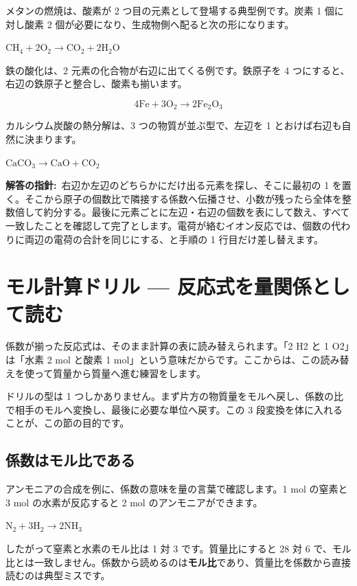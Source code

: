 \documentclass{article}
\begin{document}
メタンの燃焼は、酸素が 2 つ目の元素として登場する典型例です。炭素 1 個に対し酸素 2 個が必要になり、生成物側へ配ると次の形になります。

\( \mathrm{CH}_{4} + 2\mathrm{O}_{2} \rightarrow \mathrm{CO}_{2} + 2\mathrm{H}_{2}\mathrm{O} \)

鉄の酸化は、2 元素の化合物が右辺に出てくる例です。鉄原子を 4 つにすると、右辺の鉄原子と整合し、酸素も揃います。

\[ 4\mathrm{Fe} + 3\mathrm{O}_{2} \rightarrow 2\mathrm{Fe}_{2}\mathrm{O}_{3} \]

カルシウム炭酸の熱分解は、3 つの物質が並ぶ型で、左辺を 1 とおけば右辺も自然に決まります。

\( \mathrm{CaCO}_{3} \rightarrow \mathrm{CaO} + \mathrm{CO}_{2} \)

\textbf{解答の指針:}\ 右辺か左辺のどちらかにだけ出る元素を探し、そこに最初の 1 を置く。そこから原子の個数比で隣接する係数へ伝播させ、小数が残ったら全体を整数倍して約分する。最後に元素ごとに左辺・右辺の個数を表にして数え、すべて一致したことを確認して完了とします。電荷が絡むイオン反応では、個数の代わりに両辺の電荷の合計を同じにする、と手順の 1 行目だけ差し替えます。

\section{モル計算ドリル — 反応式を量関係として読む}

係数が揃った反応式は、そのまま計算の表に読み替えられます。「2 H2 と 1 O2」は「水素 2 mol と酸素 1 mol」という意味だからです。ここからは、この読み替えを使って質量から質量へ進む練習をします。

ドリルの型は 1 つしかありません。まず片方の物質量をモルへ戻し、係数の比で相手のモルへ変換し、最後に必要な単位へ戻す。この 3 段変換を体に入れることが、この節の目的です。

\subsection{係数はモル比である}

アンモニアの合成を例に、係数の意味を量の言葉で確認します。1 mol の窒素と 3 mol の水素が反応すると 2 mol のアンモニアができます。

\( \mathrm{N}_{2} + 3\mathrm{H}_{2} \rightarrow 2\mathrm{NH}_{3} \)

したがって窒素と水素のモル比は 1 対 3 です。質量比にすると 28 対 6 で、モル比とは一致しません。係数から読めるのは\textbf{モル比}であり、質量比を係数から直接読むのは典型ミスです。
\end{document}
